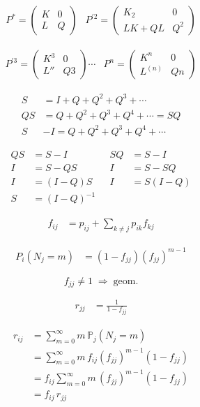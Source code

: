 \[
\begin{array}{cc}
  P^{*} = \begin{pmatrix} K&0\\L&Q \end{pmatrix} &
  P^{'2} = \begin{pmatrix} K_{2}&0\\LK + QL& Q^{2} \end{pmatrix} 
\end{array}
\]

\[
    \begin{array}{cc}
    P^{'3} = \begin{pmatrix} K^{3}&0\\L''&Q{3} \end{pmatrix}  \cdots & 
    P^{n} = \begin{pmatrix} K^{n}&0\\L^{(n)}&Q{n} \end{pmatrix}
    \end{array}
\]

\begin{align*}
    S & = I + Q + Q^{2} + Q^{3} + \cdots \\
    QS & = Q + Q^{2} + Q^{3} + Q^{4} + \cdots = SQ \\
    S & - I = Q + Q^{2} + Q^{3} + Q^{4} + \cdots   
\end{align*}

\begin{align*}
QS &= S - I \quad & SQ &= S - I \\
I &= S - QS \quad & I &= S - SQ \\
I &= (I - Q)S \quad & I &= S(I - Q) \\
S &= (I - Q)^{-1}
\end{align*}

\begin{align*}
f_{ij} &= p_{ij} + \sum_{k \ne j} p_{ik} f_{kj}
\end{align*}

\begin{align*}
P_{i}(N_j = m) &= (1 - f_{jj})(f_{jj})^{m-1}
\end{align*}

\[
f_{jj} \ne 1 \;\Rightarrow\; \text{geom.}
\]

\begin{align*}
r_{jj} &= \frac{1}{1 - f_{jj}}
\end{align*}

\begin{align*}
r_{ij} &= \sum_{m=0}^{\infty} m \, \mathbb{P}_j(N_j = m) \\
       &= \sum_{m=0}^{\infty} m \, f_{ij}(f_{jj})^{m-1}(1 - f_{jj}) \\
       &= f_{ij} \sum_{m=0}^{\infty} m \, (f_{jj})^{m-1}(1 - f_{jj}) \\
       &= f_{ij} \, r_{jj}
\end{align*}

